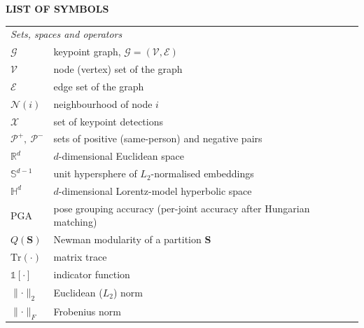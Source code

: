 
{
  \thispagestyle{empty}

  {\bfseries\Large LIST OF SYMBOLS}

  \vspace*{1cm}

  \begin{longtable}{p{3cm}l}

    \multicolumn{2}{l}{\textit{Sets, spaces and operators}} \\[3pt]
    $\mathcal{G}$            & keypoint graph, $\mathcal{G}=(\mathcal{V},\mathcal{E})$ \\
    $\mathcal{V}$            & node (vertex) set of the graph \\
    $\mathcal{E}$            & edge set of the graph \\
    $\mathcal{N}(i)$         & neighbourhood of node $i$ \\
    $\mathcal{X}$            & set of keypoint detections \\
    $\mathcal{P}^{+},\ \mathcal{P}^{-}$ & sets of positive (same-person) and negative pairs \\
    $\mathbb{R}^{d}$         & $d$-dimensional Euclidean space \\
    $\mathbb{S}^{d-1}$       & unit hypersphere of $L_2$-normalised embeddings \\
    $\mathbb{H}^{d}$         & $d$-dimensional Lorentz-model hyperbolic space \\
    $\mathrm{PGA}$           & pose grouping accuracy (per-joint accuracy after Hungarian matching) \\
    $Q(\mathbf{S})$          & Newman modularity of a partition $\mathbf{S}$ \\
    $\mathrm{Tr}(\cdot)$     & matrix trace \\
    $\mathbb{1}[\cdot]$      & indicator function \\
    $\lVert\cdot\rVert_2$    & Euclidean ($L_2$) norm \\
    $\lVert\cdot\rVert_F$    & Frobenius norm \\[6pt]


\end{longtable}}

